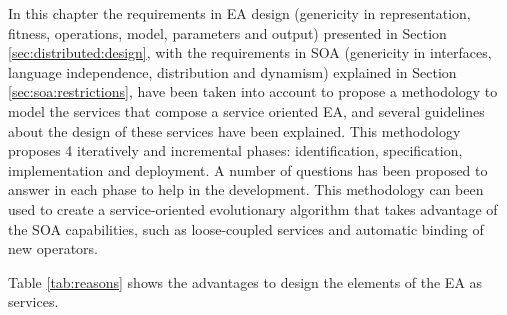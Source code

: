 In this chapter the requirements in EA design (genericity in representation, fitness, operations, model, parameters and output) presented  in Section \ref{sec:distributed:design}, with the requirements in SOA (genericity in interfaces, language independence, distribution and dynamism) explained in Section \ref{sec:soa:restrictions}, have been taken into account to propose a methodology to model the services that compose a service oriented EA, and several guidelines about the design of these services have been explained. This methodology proposes 4 iteratively and incremental phases: identification, specification, implementation and deployment. A number of questions has been proposed to answer in each phase to help in the development. This methodology can been used to create a service-oriented evolutionary algorithm that takes advantage of the SOA capabilities, such as loose-coupled services and automatic binding of new operators. 



Table \ref{tab:reasons} shows the advantages to design the elements of the EA as services.


